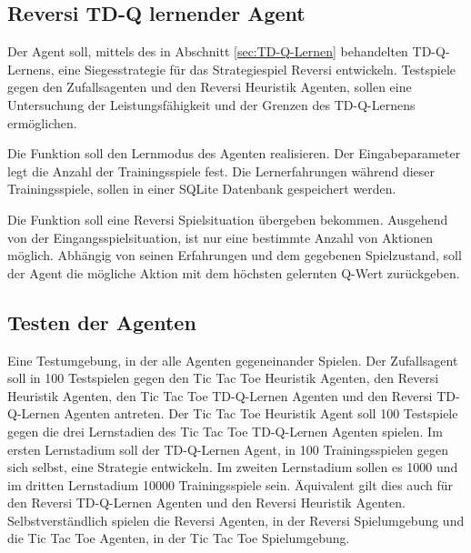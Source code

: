 \subsection{Reversi TD-Q lernender Agent}
Der Agent soll, mittels des in Abschnitt \ref{sec:TD-Q-Lernen} behandelten TD-Q-Lernens, eine Siegesstrategie für das Strategiespiel Reversi entwickeln. Testspiele gegen den Zufallsagenten und den Reversi Heuristik Agenten, sollen eine Untersuchung der Leistungsfähigkeit und der Grenzen des TD-Q-Lernens ermöglichen.

Die Funktion soll den Lernmodus des Agenten realisieren. Der Eingabeparameter legt die Anzahl der Trainingsspiele fest. Die Lernerfahrungen während dieser Trainingsspiele, sollen in einer SQLite Datenbank gespeichert werden.

Die Funktion soll eine Reversi Spielsituation übergeben bekommen. Ausgehend von der Eingangsspielsituation, ist nur eine bestimmte Anzahl von Aktionen möglich. Abhängig von seinen Erfahrungen und dem gegebenen Spielzustand, soll der Agent die mögliche Aktion mit dem höchsten gelernten Q-Wert zurückgeben.

\subsection{Testen der Agenten}
Eine Testumgebung, in der alle Agenten gegeneinander Spielen. Der Zufallsagent soll in 100 Testspielen gegen den Tic Tac Toe Heuristik Agenten, den Reversi Heuristik Agenten, den Tic Tac Toe TD-Q-Lernen Agenten und den Reversi TD-Q-Lernen Agenten antreten. Der Tic Tac Toe Heuristik Agent soll 100 Testspiele gegen die drei Lernstadien des Tic Tac Toe TD-Q-Lernen Agenten spielen. Im ersten Lernstadium soll der TD-Q-Lernen Agent, in 100 Trainingsspielen gegen sich selbst, eine Strategie entwickeln. Im zweiten Lernstadium sollen es 1000 und im dritten Lernstadium 10000 Trainingsspiele sein. Äquivalent gilt dies auch für den Reversi TD-Q-Lernen Agenten und den Reversi Heuristik Agenten. Selbstverständlich spielen die Reversi Agenten, in der Reversi Spielumgebung und die Tic Tac Toe Agenten, in der Tic Tac Toe Spielumgebung.
